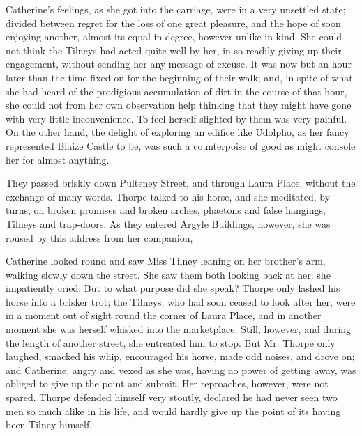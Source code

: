 Catherine's feelings, as she got into the carriage, were in a very unsettled state; divided between regret for the loss of one great pleasure, and the hope of soon enjoying another, almost its equal in degree, however unlike in kind. She could not think the Tilneys had acted quite well by her, in so readily giving up their engagement, without sending her any message of excuse. It was now but an hour later than the time fixed on for the beginning of their walk; and, in spite of what she had heard of the prodigious accumulation of dirt in the course of that hour, she could not from her own observation help thinking that they might have gone with very little inconvenience. To feel herself slighted by them was very painful. On the other hand, the delight of exploring an edifice like Udolpho, as her fancy represented Blaize Castle to be, was such a counterpoise of good as might console her for almost anything.

They passed briskly down Pulteney Street, and through Laura Place, without the exchange of many words. Thorpe talked to his horse, and she meditated, by turns, on broken promises and broken arches, phaetons and false hangings, Tilneys and trap-doors. As they entered Argyle Buildings, however, she was roused by this address from her companion, 


 Catherine looked round and saw Miss Tilney leaning on her brother's arm, walking slowly down the street. She saw them both looking back at her.  she impatiently cried;  But to what purpose did she speak? Thorpe only lashed his horse into a brisker trot; the Tilneys, who had soon ceased to look after her, were in a moment out of sight round the corner of Laura Place, and in another moment she was herself whisked into the marketplace. Still, however, and during the length of another street, she entreated him to stop.  But Mr. Thorpe only laughed, smacked his whip, encouraged his horse, made odd noises, and drove on; and Catherine, angry and vexed as she was, having no power of getting away, was obliged to give up the point and submit. Her reproaches, however, were not spared.  Thorpe defended himself very stoutly, declared he had never seen two men so much alike in his life, and would hardly give up the point of its having been Tilney himself.


